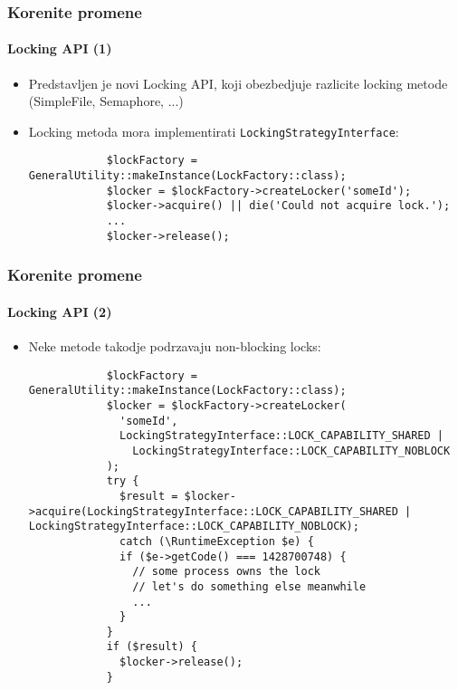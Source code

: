 \begin{frame}[fragile]
	\frametitle{Korenite promene}
	\framesubtitle{Locking API (1)}

	\begin{itemize}

		\item Predstavljen je novi Locking API, koji obezbedjuje razlicite locking metode (SimpleFile, Semaphore, ...)
		\item Locking metoda mora implementirati \small\texttt{LockingStrategyInterface}\normalsize:
		\begin{lstlisting}
			$lockFactory = GeneralUtility::makeInstance(LockFactory::class);
			$locker = $lockFactory->createLocker('someId');
			$locker->acquire() || die('Could not acquire lock.');
			...
			$locker->release();
		\end{lstlisting}

	\end{itemize}

\end{frame}

\begin{frame}[fragile]
	\frametitle{Korenite promene}
	\framesubtitle{Locking API (2)}

	\lstset{basicstyle=\tiny\ttfamily}

	\begin{itemize}

		\item Neke metode takodje podrzavaju non-blocking locks:

		\begin{lstlisting}
			$lockFactory = GeneralUtility::makeInstance(LockFactory::class);
			$locker = $lockFactory->createLocker(
			  'someId',
			  LockingStrategyInterface::LOCK_CAPABILITY_SHARED |
			    LockingStrategyInterface::LOCK_CAPABILITY_NOBLOCK
			);
			try {
			  $result = $locker->acquire(LockingStrategyInterface::LOCK_CAPABILITY_SHARED | LockingStrategyInterface::LOCK_CAPABILITY_NOBLOCK);
			  catch (\RuntimeException $e) {
			  if ($e->getCode() === 1428700748) {
			    // some process owns the lock
			    // let's do something else meanwhile
			    ...
			  }
			}
			if ($result) {
			  $locker->release();
			}
		\end{lstlisting}

	\end{itemize}

\end{frame}

